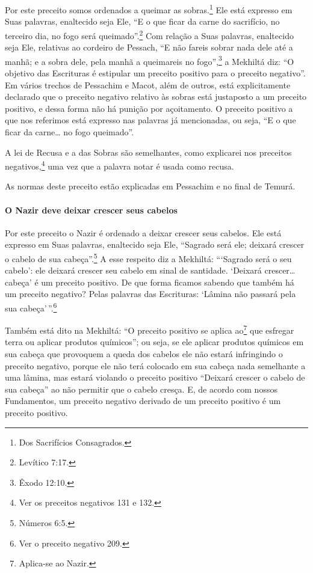 Por este preceito somos ordenados a queimar as
sobras.\footnote{Dos Sacrifícios Consagrados.} Ele está expresso em Suas palavras,
enaltecido seja Ele, ``E o que ficar da carne do sacrifício, no terceiro dia, no fogo será queimado''.\footnote{Levítico 7:17.} Com
relação a Suas palavras, enaltecido seja Ele, relativas ao cordeiro de
Pessach, ``E não fareis sobrar nada dele até a manhã; e a sobra
dele, pela manhã a queimareis no fogo'',\footnote{Êxodo 12:10.} a Mekhiltá diz:
``O objetivo das Escrituras é estipular um preceito positivo para o
preceito negativo''. Em vários trechos de Pessachim e Macot, além de
outros, está explicitamente declarado que o preceito negativo relativo
às sobras está justaposto a um preceito positivo, e dessa forma não há
punição por açoitamento. O preceito positivo a que nos referimos está
expresso nas palavras já mencionadas, ou seja, ``E o que ficar da
carne\ldots{} no fogo queimado''.

A lei de Recusa e a das Sobras são semelhantes, como explicarei
nos preceitos negativos,\footnote{Ver os preceitos negativos 131 e 132.} uma vez que a palavra notar\starr{} é usada como recusa.

As normas deste preceito estão explicadas em Pessachim e no final de Temurá.

\paragraph{O Nazir deve deixar crescer seus cabelos}

Por este preceito o Nazir é ordenado a deixar crescer seus cabelos. Ele
está expresso em Suas palavras, enaltecido seja Ele, ``Sagrado será ele;
deixará crescer o cabelo de sua cabeça''.\footnote{Números 6:5.} A esse respeito
diz a Mekhiltá: ```Sagrado será o seu cabelo': ele deixará crescer seu
cabelo em sinal de santidade. `Deixará crescer\ldots{} cabeça' é um preceito
positivo. De que forma ficamos sabendo que também há um preceito
negativo? Pelas palavras das Escrituras: `Lâmina não passará pela sua
cabeça'\,''.\footnote{Ver o preceito negativo 209.}

Também está dito na Mekhiltá: ``O preceito positivo se aplica
ao\footnote{Aplica-se ao Nazir.} que esfregar terra ou aplicar produtos
químicos''; ou seja, se ele aplicar produtos químicos em sua cabeça que provoquem a queda dos cabelos ele não
estará infringindo o preceito negativo, porque ele não terá colocado em
sua cabeça nada semelhante a uma lâmina, mas estará violando o preceito
positivo ``Deixará crescer o cabelo de sua cabeça'' ao não permitir que
o cabelo cresça. E, de acordo com nossos Fundamentos, um preceito
negativo derivado de um preceito positivo é um preceito positivo.


